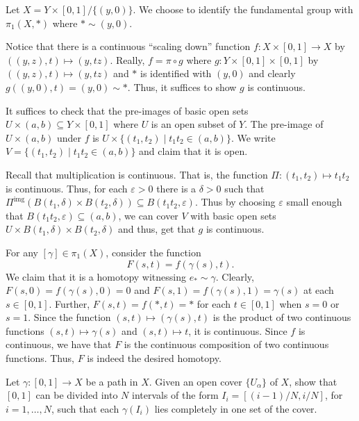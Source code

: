 \documentclass[12 pt, letterpaper]{hmcpset}
\begin{document}
\begin{solution}
	Let $X = Y \times [0, 1] / \{ (y, 0) \}$. We choose to identify the fundamental group with $\pi_{1}(X, *)$ where $* \sim (y, 0)$.

	Notice that there is a continuous ``scaling down'' function $f : X \times [0, 1] \to X$ by $((y, z), t) \mapsto (y, t z)$. Really, $f = \pi \circ g$ where $g : Y \times [0, 1] \times [0, 1]$ by $((y, z), t) \mapsto (y, tz)$ and $*$ is identified with $(y, 0)$ and clearly $g((y, 0), t) = (y, 0) \sim *$. Thus, it suffices to show $g$ is continuous.

	It suffices to check that the pre-images of basic open sets $U \times (a, b) \subseteq Y \times [0, 1]$ where $U$ is an open subset of $Y$. The pre-image of $U \times (a, b)$ under $f$ is $U \times \{ (t_{1}, t_{2}) \mid t_{1} t_{2} \in (a, b) \}$. We write $V = \{ (t_{1}, t_{2}) \mid t_{1} t_{2} \in (a, b) \}$ and claim that it is open.

	Recall that multiplication is continuous. That is, the function $\Pi : (t_{1}, t_{2}) \mapsto t_{1} t_{2}$ is continuous. Thus, for each $\varepsilon > 0$ there is a $\delta > 0$ such that $\Pi^{\text{img}}(B(t_{1}, \delta) \times B(t_{2}, \delta)) \subseteq B(t_{1}t_{2}, \varepsilon)$. Thus by choosing $\varepsilon$ small enough that $B(t_{1} t_{2}, \varepsilon) \subseteq (a, b)$, we can cover $V$ with basic open sets $U \times B(t_{1}, \delta) \times B(t_{2}, \delta)$ and thus, get that $g$ is continuous.

	For any $[\gamma] \in \pi_{1}(X)$, consider the function
	\[
		F(s, t) = f(\gamma(s), t).
	\]
	We claim that it is a homotopy witnessing $e_{*} \sim \gamma$. Clearly, $F(s, 0) = f(\gamma(s), 0) = 0$ and  $F(s, 1) = f(\gamma(s), 1) = \gamma(s)$ at each $s \in [0, 1]$. Further, $F(s, t) = f(*, t) = *$ for each $t \in [0, 1]$ when $s = 0$ or $s = 1$. Since the function $(s, t) \mapsto (\gamma(s), t)$ is the product of two continuous functions $(s, t) \mapsto \gamma(s)$ and $(s, t) \mapsto t$, it is continuous. Since $f$ is continuous, we have that $F$ is the continuous composition of two continuous functions. Thus, $F$ is indeed the desired homotopy.
\end{solution}

\pagebreak

\begin{problem}[12.17 (1)]
	Let $\gamma : [0, 1] \to X$ be a path in $X$. Given an open cover $\{ U_{\alpha} \}$ of $X$, show that $[0, 1]$ can be divided into $N$ intervals of the form $I_{i} = [(i - 1) / N, i / N]$, for $i = 1, \dots, N$, such that each $\gamma(I_{i})$ lies completely in one set of the cover.
\end{problem}
\end{document}
